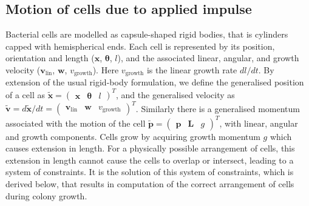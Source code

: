 \documentclass{report}
\renewcommand{\vec}[1]{\mathbf{#1}}
\begin{document}
\subsection{Motion of cells due to applied impulse} 
Bacterial cells are modelled as capsule-shaped rigid bodies, that is cylinders
capped with hemispherical ends. Each cell is represented by its
position, orientation and length ($\vec{x}$, $\vec{\theta}$, $l$), and the
associated linear, angular, and growth velocity ($\vec{v}_\textrm{lin}$,
$\vec{w}$, $v_\textrm{growth}$). Here $v_\textrm{growth}$ is the
linear growth rate $dl/dt$. By extension of the usual rigid-body
formulation, we define the generalised position of a cell as
$\tilde{\vec{x}} = 
\left(\begin{array}{lll}\vec{x} & \vec{\theta} & l \end{array}\right)^T$, and
the generalised velocity as $\tilde{\vec{v}} = d\tilde{\vec{x}}/dt =  
\left(\begin{array}{lll}\vec{v}_\textrm{lin} & \vec{w} & v_\textrm{growth} \end{array}\right)^T$.
Similarly there is a generalised momentum associated with the motion of the cell 
$\tilde{\vec{p}} =  
\left(\begin{array}{lll}\vec{p} & \vec{L} & g \end{array}\right)^T$, with
linear, angular and growth components.
Cells grow by
acquiring growth momentum $g$ which causes extension in length.  For a physically
possible arrangement of cells, this extension in length cannot cause the cells
to overlap or intersect, leading to a system of constraints. It is the solution
of this system of constraints, which is derived below, that results in
computation of the correct arrangement of cells during colony growth.
\end{document}
